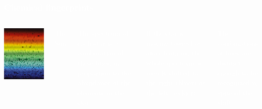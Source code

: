 \documentclass[compress]{beamer}
\begin{document}
\begin{frame}
\frametitle{\textcolor{white}{Chemical fingerprints}}
\begin{columns}

\includegraphics[width=\linewidth]{pictures/solarspectrum.jpg}

\centering \Large \textcolor{white}{The Sun}

\textcolor{white}{The spectrum of each star is a combination of these lines, in proportion to the abundance of the elements in the star.}

\vspace{0.25 cm}
\textcolor{white}{If the star is moving toward or away from us, the whole spectrum is merely shifted to the right (bluer) or the left (redder).}

\vspace{0.25 cm}
\textcolor{white}{The combinations of lines are distinct enough to be recognized in spite of the shift.}

\end{columns}
\end{frame}
\endgroup
\end{document}
